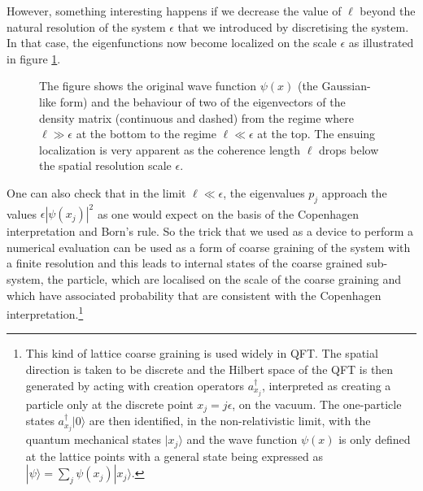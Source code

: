 \documentclass[12pt]{article}
\def\ket#1{| #1\rangle}
\begin{document}
However, something interesting happens if we decrease the value of $\ell$ beyond the natural resolution of the system $\epsilon$ that we introduced by discretising the system. In that case, the eigenfunctions now become localized on the scale $\epsilon$ as illustrated in figure \ref{f1}.
\begin{figure}
\begin{center}
\caption{\small The figure shows the original wave function $\psi(x)$ (the Gaussian-like form) and the behaviour of two of the eigenvectors of the density matrix (continuous and dashed) from the regime where $\ell\gg\epsilon$ at the bottom to the regime $\ell\ll\epsilon$ at the top. The ensuing localization is very apparent as the coherence length $\ell$ drops below the spatial resolution scale $\epsilon$.}
\label{f1} 
\end{center}
\end{figure}
One can also check that in the limit $\ell\ll\epsilon$, the eigenvalues $p_j$ approach the values 
$\epsilon|\psi(x_j)|^2$ as one would expect on the basis of the Copenhagen interpretation and Born's rule. So the trick that we used as a device to perform a numerical evaluation can be used as a form of coarse graining of the system with a finite resolution and this leads to internal states of the coarse grained sub-system, the particle, which are localised on the scale of the coarse graining and which have associated probability that are consistent with the Copenhagen interpretation.\footnote{This kind of lattice coarse graining is used widely in QFT. The spatial direction is taken to be discrete and the Hilbert space of the QFT is then generated by acting with creation operators $a_{x_j}^\dagger$, interpreted as creating a particle only at the discrete point $x_j=j\epsilon$, on the vacuum. The one-particle states $a_{x_j}^\dagger\ket{0}$ are then identified, in the non-relativistic limit, with the quantum mechanical states $\ket{x_j}$ and the wave function $\psi(x)$ is only defined at the lattice points with a general state being expressed as
$\ket{\psi}=\sum_j\psi(x_j)\ket{x_j}$.}
\end{document}
